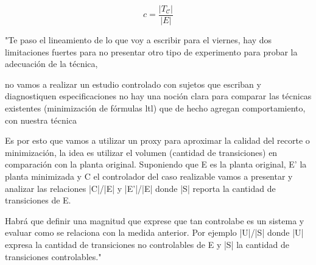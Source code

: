 \[ c = \dfrac{|T_{\mathcal{C}}|}{|E|} \]

"Te paso el lineamiento de lo que voy a escribir para el viernes, hay dos limitaciones fuertes para no presentar otro tipo de experimento para probar la adecuación de la técnica,

no vamos a realizar un estudio controlado con sujetos que escriban y diagnostiquen especificaciones
no hay una noción clara para comparar las técnicas existentes (minimización de fórmulas ltl) que de hecho agregan comportamiento, con nuestra técnica

Es por esto que vamos a utilizar un proxy para aproximar la calidad del recorte o minimización, la idea es utilizar el volumen (cantidad de transiciones) en comparación con la planta original. Suponiendo que E es la planta original, E' la planta minimizada y C el controlador del caso realizable vamos a presentar y analizar las relaciones |C|/|E| y |E'|/|E| donde |S| reporta la cantidad de transiciones de E.

Habrá que definir una magnitud que exprese que tan controlabe es un sistema y evaluar como se relaciona con la medida anterior. Por ejemplo |U|/|S| donde |U| expresa la cantidad de transiciones no controlables de E y |S| la cantidad de transiciones controlables."


